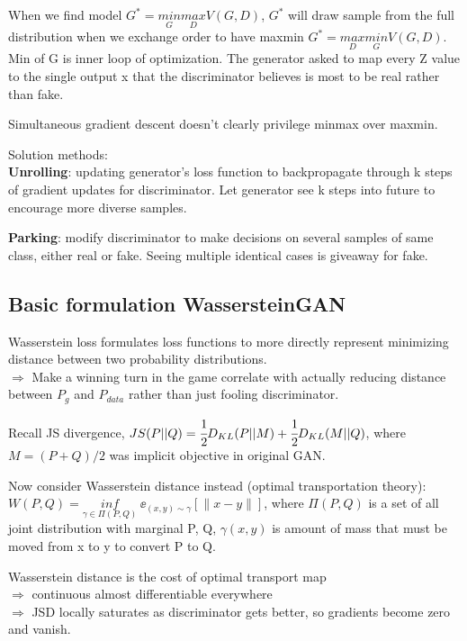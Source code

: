 \documentclass[12pt,a4paper]{article}
\begin{document}
When we find model $G^*=\underset{G}{min}\underset{D}{max} V(G,D)$, $G^*$ will draw sample from the full distribution when we exchange order to have maxmin $G^*=\underset{D}{max}\underset{G}{min} V(G,D)$.
Min of G is inner loop of optimization. The generator asked to map every Z value to the single output x that the discriminator believes is most to be real rather than fake. 

Simultaneous gradient descent doesn't clearly privilege minmax over maxmin. 

Solution methods:\\
\textbf{Unrolling}: updating generator's loss function to backpropagate through k steps of gradient updates for discriminator. Let generator see k steps into future to encourage more diverse samples. 

\textbf{Parking}: modify discriminator to make decisions on several samples of same class, either real or fake. Seeing multiple identical cases is giveaway for fake.


\subsection{Basic formulation WassersteinGAN}
Wasserstein loss formulates loss functions to more directly represent minimizing distance between two probability distributions.\\
$\Rightarrow$ Make a winning turn in the game correlate with actually reducing distance between $P_g$ and $P_{data}$ rather than just fooling discriminator. 

Recall JS divergence, $JS(P||Q)=\cfrac{1}{2}D_{KL}(P||M)+\cfrac{1}{2}D_{KL}(M||Q)$, where $M=(P+Q)/2$ was implicit objective in original GAN. 

Now consider Wasserstein distance instead (optimal transportation theory):\\
$W(P,Q)=\underset{\gamma\in \Pi(P,Q)}{inf}\ \ee_{(x,y)\sim \gamma}[\|x-y\|]$, where $\Pi(P,Q)$ is a set of all joint distribution with marginal P, Q, $\gamma(x,y)$ is amount of mass that must be moved from x to y to convert P to Q. 

Wasserstein distance is the cost of optimal transport map\\
$\Rightarrow$ continuous almost differentiable everywhere\\
$\Rightarrow$ JSD locally saturates as discriminator gets better, so gradients become zero and vanish. 
\end{document}
